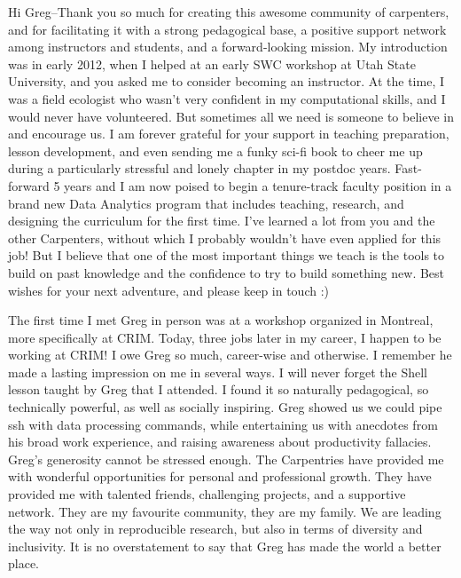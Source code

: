 

Hi Greg--Thank you so much for creating this awesome community of carpenters,
and for facilitating it with a strong pedagogical base, a positive support
network among instructors and students, and a forward-looking mission. My
introduction was in early 2012, when I helped at an early SWC workshop at Utah
State University, and you asked me to consider becoming an instructor. At the
time, I was a field ecologist who wasn’t very confident in my computational
skills, and I would never have volunteered. But sometimes all we need is
someone to believe in and encourage us. I am forever grateful for your support
in teaching preparation, lesson development, and even sending me a funky sci-fi
book to cheer me up during a particularly stressful and lonely chapter in my
postdoc years. Fast-forward 5 years and I am now poised to begin a tenure-track
faculty position in a brand new Data Analytics program that includes teaching,
research, and designing the curriculum for the first time. I’ve learned a lot
from you and the other Carpenters, without which I probably wouldn’t have even
applied for this job! But I believe that one of the most important things we
teach is the tools to build on past knowledge and the confidence to try to
build something new. Best wishes for your next adventure, and please keep in
touch :)



The first time I met Greg in person was at a workshop organized in Montreal,
more specifically at CRIM. Today, three jobs later in my career, I happen to be
working at CRIM! I owe Greg so much, career-wise and otherwise. I remember he
made a lasting impression on me in several ways. I will never forget the Shell
lesson taught by Greg that I attended. I found it so naturally pedagogical, so
technically powerful, as well as socially inspiring. Greg showed us we could
pipe ssh with data processing commands, while entertaining us with anecdotes
from his broad work experience, and raising awareness about productivity
fallacies. Greg's generosity cannot be stressed enough. The Carpentries have
provided me with wonderful opportunities for personal and professional growth.
They have provided me with talented friends, challenging projects, and a
supportive network. They are my favourite community, they are my family. We are
leading the way not only in reproducible research, but also in terms of
diversity and inclusivity. It is no overstatement to say that Greg has made the
world a better place.

